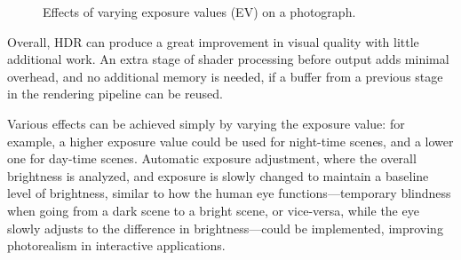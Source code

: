 \documentclass[11pt, oneside]{report}
\begin{document}
\begin{figure}[!htbp]
  \centering
  \hfill
  \hfill
  \hfill
  \hfill
  \caption{Effects of varying exposure values (EV) on a photograph.}
\end{figure}

Overall, HDR can produce a great improvement in visual quality with little additional work. An extra stage of shader processing before output adds minimal overhead, and no additional memory is needed, if a buffer from a previous stage in the rendering pipeline can be reused. 

Various effects can be achieved simply by varying the exposure value: for example, a higher exposure value could be used for night-time scenes, and a lower one for day-time scenes. Automatic exposure adjustment, where the overall brightness is analyzed, and exposure is slowly changed to maintain a baseline level of brightness, similar to how the human eye functions---temporary blindness when going from a dark scene to a bright scene, or vice-versa, while the eye slowly adjusts to the difference in brightness---could be implemented, improving photorealism in interactive applications.
\end{document}
